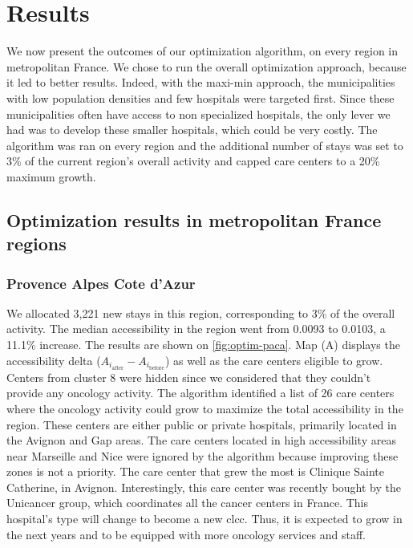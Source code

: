 \section{Results}

We now present the outcomes of our optimization algorithm, on every region in
metropolitan France. We chose to run the overall optimization approach, because
it led to better results. Indeed, with the maxi-min approach, the municipalities
with low population densities and few hospitals were targeted first. Since these
municipalities often have access to non specialized hospitals, the only lever we
had was to develop these smaller hospitals, which could be very costly. The
algorithm was ran on every region and the additional number of stays was set to
3\% of the current region's overall activity and capped care centers to a
20\% maximum growth.

\subsection{Optimization results in metropolitan France regions}

\subsubsection{Provence Alpes Cote d'Azur}

We allocated 3,221 new stays in this region, corresponding to 3\% of the overall
activity. The median accessibility in the region went from 0.0093 to 0.0103, a
11.1\% increase. The results are shown on \cref{fig:optim-paca}. Map (A)
displays the accessibility delta ($A_{i_\text{after}} - A_{i_\text{before}}$) as
well as the care centers eligible to grow. Centers from cluster 8 were hidden
since we considered that they couldn't provide any oncology activity. The
algorithm identified a list of 26 care centers where the oncology activity could
grow to maximize the total accessibility in the region. These centers are either
public or private hospitals, primarily located in the Avignon and Gap areas. The
care centers located in high accessibility areas near Marseille and Nice were
ignored by the algorithm because improving these zones is not a priority. The
care center that grew the most is Clinique Sainte Catherine, in Avignon.
Interestingly, this care center was recently bought by the Unicancer group,
which coordinates all the cancer centers in France. This hospital's type will
change to become a new \ac{clcc}. Thus, it is expected to grow in the next years
and to be equipped with more oncology services and staff.

